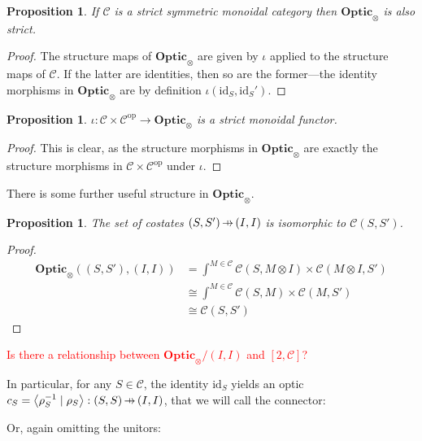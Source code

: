 \documentclass[11pt,a4paper]{article}
\theoremstyle{plain}
\newtheorem{proposition}[theorem]{Proposition}
\theoremstyle{definition}
\newcommand{\C}{\mathscr{C}}
\newcommand{\Optic}{\mathbf{Optic}}
\newcommand{\id}{\mathrm{id}}
\newcommand{\op}{\mathrm{op}}
\newcommand{\rep}[2]{{\ensuremath \left\langle #1 \mid #2 \right\rangle}}
\newcommand{\hto}{\ensuremath{\,\mathaccent\shortmid\rightarrow\,}}
\newcommand{\todo}[1]{\textcolor{red}{\small #1}}
\begin{document}
\begin{proposition}
  If $\C$ is a strict symmetric monoidal category then $\Optic_\otimes$ is also strict.
\end{proposition}
\begin{proof}
  The structure maps of $\Optic_\otimes$ are given by $\iota$ applied to the structure maps of $\C$. If the latter are identities, then so are the former---the identity morphisms in $\Optic_\otimes$ are by definition $\iota(\id_S, \id_S')$.
\end{proof}

\begin{proposition}
  $\iota : \C \times \C^\op \to \Optic_\otimes$ is a strict monoidal functor.
\end{proposition}
\begin{proof}
  This is clear, as the structure morphisms in $\Optic_\otimes$ are exactly the structure morphisms in $\C \times \C^\op$ under $\iota$.
\end{proof}


There is some further useful structure in $\Optic_\otimes$.
\begin{proposition}\label{prop-costates}
  The set of costates $(S, S') \hto (I, I)$ is isomorphic to $\C(S, S')$.
\end{proposition}
\begin{proof}
  \begin{align*}
    \Optic_\otimes((S, S'), (I, I))
    &= \int^{M \in \C} \C(S, M \otimes I) \times \C(M \otimes I, S') \\
    &\cong \int^{M \in \C} \C(S, M) \times \C(M, S') \\
    &\cong \C(S, S')
  \end{align*}
\end{proof}

\todo{Is there a relationship between $\Optic_\otimes/(I, I)$ and $[2, \C]$?}

In particular, for any $S \in \C$, the identity $\id_S$ yields an optic $c_S = \rep{\rho_S^{-1}}{\rho_S} : (S, S) \hto (I, I)$, that we will call the connector:
\begin{center}
  
\end{center}
Or, again omitting the unitors:
\begin{center}
  
\end{center}
\end{document}
